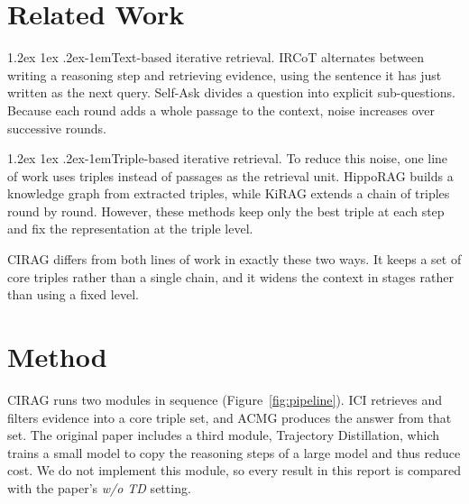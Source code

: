 \documentclass[11pt]{article}
\makeatletter
\renewcommand\paragraph{\@startsection{paragraph}{4}{\z@}%
  {1.2ex \@plus1ex \@minus.2ex}{-1em}{\normalfont\normalsize\bfseries}}
\makeatother
\begin{document}
\section{Related Work}
\label{sec:related}

\paragraph{Text-based iterative retrieval.} IRCoT \citep{trivedi2023ircot} alternates
between writing a reasoning step and retrieving evidence, using the sentence it has just
written as the next query. Self-Ask \citep{press2023selfask} divides a question into explicit
sub-questions. Because each round adds a whole passage to the context, noise increases over
successive rounds.

\paragraph{Triple-based iterative retrieval.} To reduce this noise, one line of work uses
triples instead of passages as the retrieval unit. HippoRAG \citep{jimenez2024hipporag} builds
a knowledge graph from extracted triples, while KiRAG \citep{fang2025kirag} extends a chain
of triples round by round. However, these methods keep only the best triple at each step and
fix the representation at the triple level.

CIRAG differs from both lines of work in exactly these two ways. It keeps a set of core
triples rather than a single chain, and it widens the context in stages rather than using a
fixed level.

\section{Method}
\label{sec:method}

CIRAG runs two modules in sequence (Figure~\ref{fig:pipeline}). ICI retrieves and filters
evidence into a core triple set, and ACMG produces the answer from that set. The original
paper includes a third module, Trajectory Distillation, which trains a small model to copy
the reasoning steps of a large model and thus reduce cost. We do not implement this module,
so every result in this report is compared with the paper's \emph{w/o TD} setting.
\end{document}
